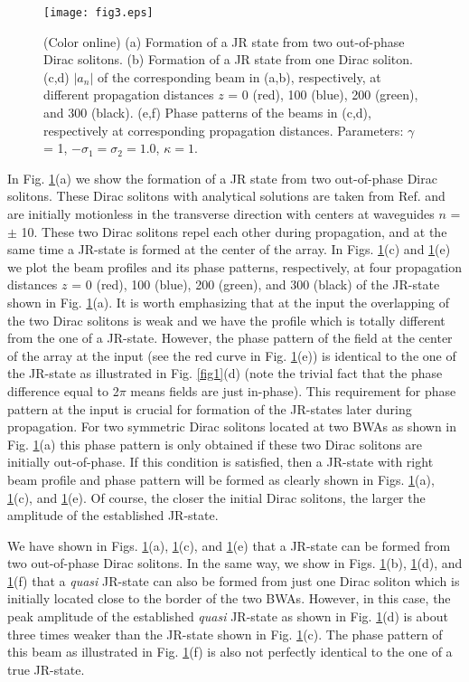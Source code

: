 \documentclass[twocolumn,aps, prl,showpacs]{revtex4}
\begin{document}
\begin{figure}[htb]
  \centering \texttt{[image: fig3.eps]}
\caption{\small{(Color online) (a) Formation of a JR state from two out-of-phase Dirac solitons. (b) Formation of a JR state from one Dirac soliton. (c,d) $|a_{n}|$ of the corresponding beam in (a,b), respectively, at different propagation distances $z$ = 0 (red), 100 (blue), 200 (green), and 300 (black). (e,f) Phase patterns of the beams in (c,d), respectively at corresponding propagation distances. Parameters: $\gamma$ = 1, $-\sigma_{1} = \sigma_{2} = 1.0$, $\kappa = 1$.}}
  \label{fig3}
\end{figure}

In Fig. \ref{fig3}(a) we show the formation of a JR state from two out-of-phase Dirac solitons. These Dirac solitons with analytical solutions are taken from Ref. \cite{trandirac1} and are initially motionless in the transverse direction with centers at waveguides $n$ = $\pm$ 10. These two Dirac solitons repel each other during propagation, and at the same time a JR-state is formed at the center of the array. In Figs. \ref{fig3}(c) and \ref{fig3}(e) we plot the beam profiles and its phase patterns, respectively, at four propagation distances $z$ = 0 (red), 100 (blue), 200 (green), and 300 (black) of the JR-state shown in Fig. \ref{fig3}(a). It is worth emphasizing that at the input the overlapping of the two Dirac solitons is weak and we have the profile which is totally different from the one of a JR-state. However, the phase pattern of the field at the center of the array at the input (see the red curve in  Fig. \ref{fig3}(e)) is identical to the one of the JR-state as illustrated in Fig. \ref{fig1}(d) (note the trivial fact that the phase difference equal to 2$\pi$ means fields are just in-phase). This requirement for phase pattern at the input is crucial for formation of the JR-states later during propagation. For two symmetric Dirac solitons located at two BWAs as shown in Fig. \ref{fig3}(a) this phase pattern is only obtained if these two Dirac solitons are initially out-of-phase. If this condition is satisfied, then a JR-state with right beam profile and phase pattern will be formed as clearly shown in Figs. \ref{fig3}(a), \ref{fig3}(c), and \ref{fig3}(e). Of course, the closer the initial Dirac solitons, the larger the amplitude of the established JR-state.

We have shown in Figs. \ref{fig3}(a), \ref{fig3}(c), and \ref{fig3}(e) that a JR-state can be formed from two out-of-phase Dirac solitons. In the same way, we show in Figs. \ref{fig3}(b), \ref{fig3}(d), and \ref{fig3}(f) that a \emph{quasi} JR-state can also be formed from just one Dirac soliton which is initially located close to the border of the two BWAs. However, in this case, the peak amplitude of the established \emph{quasi} JR-state as shown in Fig. \ref{fig3}(d) is about three times weaker than the JR-state shown in Fig. \ref{fig3}(c). The phase pattern of this beam as illustrated in Fig. \ref{fig3}(f) is also not perfectly identical to the one of a true JR-state.
\end{document}

